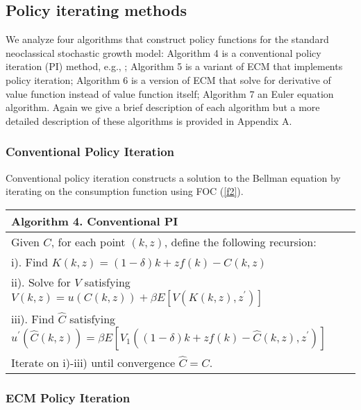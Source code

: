 \subsection{Policy iterating methods}

We analyze four algorithms that construct policy functions for the standard
neoclassical stochastic growth model: Algorithm 4 is a conventional policy iteration (PI)
method, e.g., \cite{SR2004}; Algorithm 5 is a variant of ECM that implements policy
iteration; Algorithm 6 is a version of ECM that solve for derivative of value function
instead of value function itself; Algorithm 7 an Euler equation algorithm. Again we
give a brief description of each algorithm but a more detailed description of
these algorithms is provided in Appendix A.

\subsubsection{Conventional Policy Iteration}

Conventional policy iteration constructs a solution to the Bellman equation by
iterating on the consumption function using FOC (\ref{f2}).

\qquad \newline

{\small
\begin{tabular}{l}
\hline \hline
\textbf{Algorithm 4. Conventional PI} \\ \hline
Given $C$, for each point $\left( k,z\right) $, define the following
recursion: \\
\quad i). Find $K\left(k, z\right) = \left( 1 - \delta \right)k + z f\left(k\right) - C\left( k,z\right)$ \\
\quad ii). Solve for $V$ satisfying $V\left(k, z\right) = u\left(C\left(k, z\right) \right) + \beta E\left[V\left(K\left(k, z\right), z^{\prime} \right) \right]$ \\
\quad iii). Find $\widehat{C}$ satisfying $u^{\prime }\left( \widehat{C}\left( k,z\right) \right) =\beta E\left[ V_{1}\left( \left( 1-\delta \right)k + z f\left(k\right) - \widehat{C}\left(k, z\right), z^{\prime}\right) \right]
$ \\
Iterate on i)-iii) until convergence $\widehat{C}=C$. \\ \hline \hline
\end{tabular}%
}

\qquad

\subsubsection{ECM Policy Iteration}

